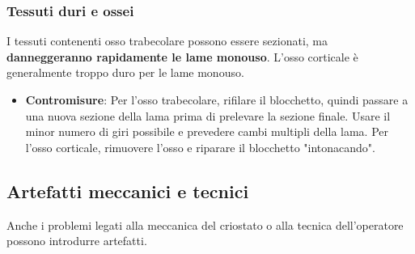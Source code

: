 \subsubsection{Tessuti duri e ossei}
I tessuti contenenti osso trabecolare possono essere sezionati, ma \textbf{danneggeranno rapidamente le lame monouso}.  L'osso corticale è generalmente troppo duro per le lame monouso.
\begin{itemize}
    \item   \textbf{Contromisure}: Per l'osso trabecolare, rifilare il blocchetto, quindi passare a una nuova sezione della lama prima di prelevare la sezione finale.  Usare il minor numero di giri possibile e prevedere cambi multipli della lama.  Per l'osso corticale, rimuovere l'osso e riparare il blocchetto "intonacando". 
\end{itemize}

\subsection{Artefatti meccanici e tecnici}

Anche i problemi legati alla meccanica del criostato o alla tecnica dell'operatore possono introdurre artefatti. 

